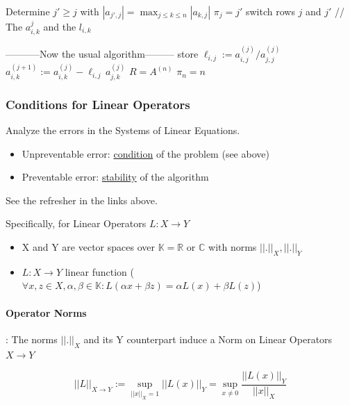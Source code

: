 \documentclass{article}
\begin{document}
\begin{algorithm}[H]
\caption{LR decomposition with Row pivoting.}
\begin{algorithmic}[1]
  \State Determine $j' \geq j$ with $|a_{j',j}| = \max_{j \leq k \leq n}|a_{k,j}|$
  \State $\pi_j = j'$
  \State switch rows $j$ and $j'$ // The $a^j_{i,k}$ and the $l_{i,k}$

  \State -----------Now the usual algorithm---------
    \State store $\ell_{i,j} := a^{(j)}_{i,j} / a^{(j)}_{j,j}$
      \State $a^{(j+1)}_{i,k} := a^{(j)}_{i,k} - \ell_{i,j}\,a^{(j)}_{j,k}$
    \EndFor
  \EndFor
\EndFor
\State $R = A^{(n)}$
\State $\pi_n = n$ 
\end{algorithmic}
\end{algorithm}

\subsubsection{Conditions for Linear Operators}
Analyze the errors in the Systems of Linear Equations. 
\begin{itemize}
  \item Unpreventable error: \hyperref[sec:condition]{condition} of the problem (see above)
  \item Preventable error: \hyperref[sec:stability]{stability} of the algorithm
\end{itemize}
See the refresher in the links above.

Specifically, for Linear Operators $L: X \to Y$

\begin{itemize}
  \item X and Y are vector spaces over $\mathbb{K} = \mathbb{R}$ or $\mathbb{C}$ with norms $||.||_X, ||.||_Y$
  \item $L: X \to Y$ linear function ($\forall x,z \in X, \alpha,\beta\in \mathbb{K}: L(\alpha x + \beta z) = \alpha L(x) + \beta L(z)$) 
\end{itemize}

\paragraph{Operator Norms}: The norms $||.||_X$ and its Y counterpart induce a Norm on Linear Operators $X \to Y$

\[||L||_{X\to Y} := \sup_{||x||_X = 1}||L(x)||_Y = \sup_{x\neq 0}\frac{||L(x)||_Y}{||x||_X}\]
\end{document}
